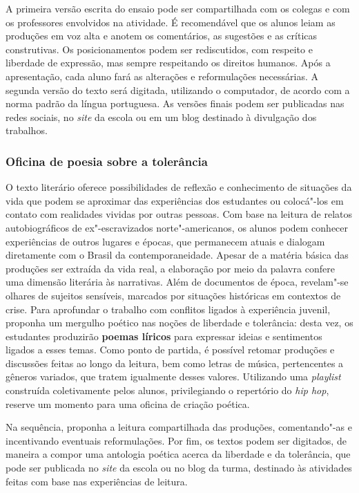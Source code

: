 \documentclass[11pt]{extarticle}
\begin{document}
A primeira versão escrita do ensaio pode ser compartilhada com os
colegas e com os professores envolvidos na atividade. É recomendável que
os alunos leiam as produções em voz alta e anotem os comentários, as
sugestões e as críticas construtivas. Os posicionamentos podem ser
rediscutidos, com respeito e liberdade de expressão, mas sempre
respeitando os direitos humanos. Após a apresentação, cada aluno fará as
alterações e reformulações necessárias. A segunda versão do texto será
digitada, utilizando o computador, de acordo com a norma padrão da
língua portuguesa. As versões finais podem ser publicadas nas redes
sociais, no \emph{site} da escola ou em um blog destinado à divulgação
dos trabalhos.

\subsubsection{Oficina de poesia sobre a tolerância}


O texto literário oferece possibilidades de reflexão e conhecimento de
situações da vida que podem se aproximar das experiências dos
estudantes ou colocá"-los em contato com realidades vividas por outras
pessoas. Com base na leitura de relatos autobiográficos de
ex"-escravizados norte"-americanos, os alunos podem conhecer
experiências de outros lugares e épocas, que permanecem atuais e
dialogam diretamente com o Brasil da contemporaneidade. Apesar de a
matéria básica das produções ser extraída da vida real, a elaboração
por meio da palavra confere uma dimensão literária às narrativas. Além
de documentos de época, revelam"-se olhares de sujeitos sensíveis,
marcados por situações históricas em contextos de crise. Para
aprofundar o trabalho com conflitos ligados à experiência juvenil,
proponha um mergulho poético nas noções de liberdade e tolerância:
desta vez, os estudantes produzirão \textbf{poemas líricos} para
expressar ideias e sentimentos ligados a esses temas. Como ponto de
partida, é possível retomar produções e discussões feitas ao longo da
leitura, bem como letras de música, pertencentes a gêneros variados,
que tratem igualmente desses valores. Utilizando uma \emph{playlist}
construída coletivamente pelos alunos, privilegiando o repertório do
\emph{hip hop}, reserve um momento para uma oficina de criação
poética. 


Na sequência, proponha a leitura compartilhada das produções,
comentando"-as e incentivando eventuais reformulações. Por fim, os
textos podem ser digitados, de maneira a compor uma antologia poética
acerca da liberdade e da tolerância, que pode ser publicada no
\emph{site} da escola ou no blog da turma, destinado às atividades
feitas com base nas experiências de leitura.
\end{document}
